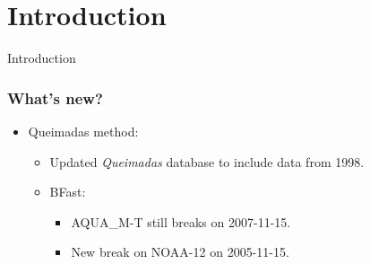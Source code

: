 \section{Introduction}

\begin{frame}
  Introduction
\end{frame}

\begin{frame}
  \frametitle{What's new?}
  \begin{itemize}
    \item Queimadas method:
      \begin{itemize}
        \item Updated \textit{Queimadas} database to include data from 1998.
            ~\hyperlink{lm_peak}{\beamergotobutton{}}
        \item BFast:
        \begin{itemize}
          \item AQUA\_M-T still breaks on 2007-11-15.
            ~\hyperlink{bfast_aqua}{\beamergotobutton{}}
          \item New break on NOAA-12 on 2005-11-15.
            ~\hyperlink{bfast_noaa}{\beamergotobutton{}}
        \end{itemize}
      \end{itemize}
  \end{itemize}
\end{frame}

